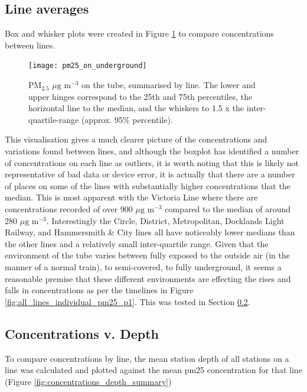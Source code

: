 \subsection{Line averages}
\label{subsec:line_averages}

Box and whisker plots were created in Figure \ref{fig:boxplot_pm25_lines} to compare concentrations between lines. 

\begin{figure}[H]
\centering
\texttt{[image: pm25\_on\_underground]}
\caption{PM$_{2.5}$ $\mu \text{g m}^{-3}$ on the tube, summarised by line. The lower and upper hinges correspond to the 25th and 75th percentiles, the horizontal line to the median, and the whiskers to 1.5 x the inter-quartile-range (approx. 95\% percentile).}
\label{fig:boxplot_pm25_lines}
\end{figure}

This visualisation gives a much clearer picture of the concentrations and variations found between lines, and although the boxplot has identified a number of concentrations on each line as outliers, it is worth noting that this is likely not representative of bad data or device error, it is actually that there are a number of places on some of the lines with substantially higher concentrations that the median. This is most apparent with the Victoria Line where there are concentrations recorded of over 900  $\mu \text{g m}^{-3}$ compared to the median of around 280  $\mu \text{g m}^{-3}$. Interestingly the Circle, District, Metropolitan, Docklands Light Railway, and Hammersmith \& City lines all have noticeably lower medians than the other lines and a relatively small inter-quartile range. Given that the environment of the tube varies between fully exposed to the outside air (in the manner of a normal train), to semi-covered, to fully underground, it seems a reasonable premise that these different environments are effecting the rises and falls in concentrations as per the timelines in Figure \ref{fig:all_lines_individual_pm25_p1}. This was tested in Section \ref{subsec:concentrations_v_depth}.

\subsection{Concentrations v. Depth}
\label{subsec:concentrations_v_depth}

To compare concentrations by line, the mean station depth of all stations on a line was calculated and plotted against the mean \gls{pm25} concentration for that line (Figure \ref{fig:concentrations_depth_summary})

